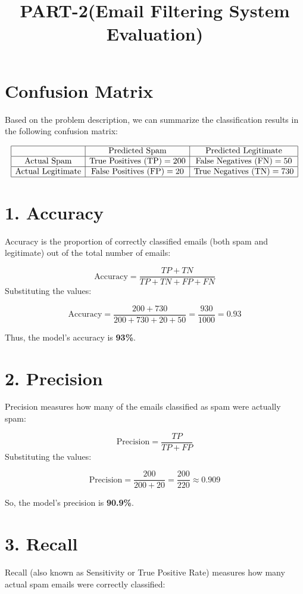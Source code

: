 \documentclass{article}
\title{PART-2(Email Filtering System Evaluation)}
\author{}
\date{}
\begin{document}
\maketitle

\section*{Confusion Matrix}

Based on the problem description, we can summarize the classification results in the following confusion matrix:

\[
\begin{array}{|c|c|c|}
\hline
 & \text{Predicted Spam} & \text{Predicted Legitimate} \\
\hline
\text{Actual Spam} & \text{True Positives (TP)} = 200 & \text{False Negatives (FN)} = 50 \\
\hline
\text{Actual Legitimate} & \text{False Positives (FP)} = 20 & \text{True Negatives (TN)} = 730 \\
\hline
\end{array}
\]

\section*{1. Accuracy}
Accuracy is the proportion of correctly classified emails (both spam and legitimate) out of the total number of emails:

\[
\text{Accuracy} = \frac{TP + TN}{TP + TN + FP + FN}
\]
Substituting the values:

\[
\text{Accuracy} = \frac{200 + 730}{200 + 730 + 20 + 50} = \frac{930}{1000} = 0.93
\]

Thus, the model's accuracy is \textbf{93\%}.

\section*{2. Precision}
Precision measures how many of the emails classified as spam were actually spam:

\[
\text{Precision} = \frac{TP}{TP + FP}
\]
Substituting the values:

\[
\text{Precision} = \frac{200}{200 + 20} = \frac{200}{220} \approx 0.909
\]

So, the model's precision is \textbf{90.9\%}.

\section*{3. Recall}
Recall (also known as Sensitivity or True Positive Rate) measures how many actual spam emails were correctly classified:
\end{document}
